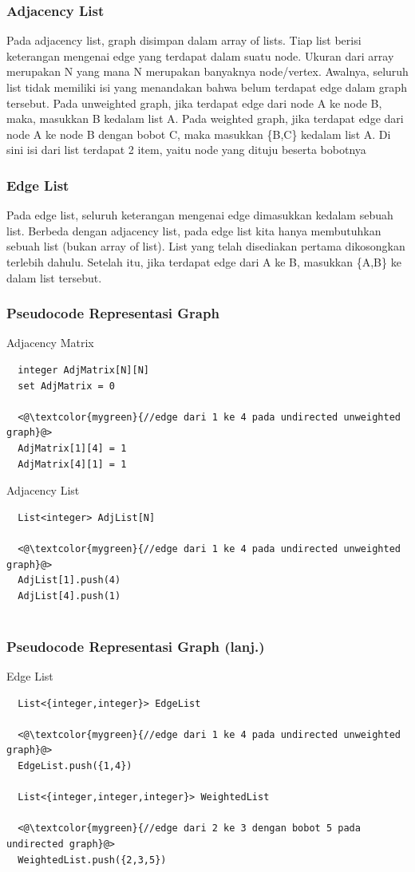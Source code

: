 \begin{frame}
\frametitle{Adjacency List}

Pada adjacency list, graph disimpan dalam array of lists. Tiap list berisi keterangan mengenai edge yang terdapat dalam suatu node. Ukuran dari array merupakan N yang mana N merupakan banyaknya node/vertex. \newline\newline
Awalnya, seluruh list tidak memiliki isi yang menandakan bahwa belum terdapat edge dalam graph tersebut. Pada unweighted graph, jika terdapat edge dari node A ke node B, maka, masukkan B kedalam list A. Pada weighted graph, jika terdapat edge dari node A ke node B dengan bobot C, maka masukkan \{B,C\} kedalam list A. Di sini isi dari list terdapat 2 item, yaitu node yang dituju beserta bobotnya
\end{frame}

\begin{frame}
\frametitle{Edge List}

Pada edge list, seluruh keterangan mengenai edge dimasukkan kedalam sebuah list. Berbeda dengan adjacency list, pada edge list kita hanya membutuhkan sebuah list (bukan array of list).
\newline\newline
List yang telah disediakan pertama dikosongkan terlebih dahulu. Setelah itu, jika terdapat edge dari A ke B, masukkan \{A,B\} ke dalam list tersebut. 

\end{frame}


\begin{frame}[fragile]
\frametitle{Pseudocode Representasi Graph}

Adjacency Matrix
\begin{lstlisting}
  integer AdjMatrix[N][N]
  set AdjMatrix = 0
  
  <@\textcolor{mygreen}{//edge dari 1 ke 4 pada undirected unweighted graph}@>
  AdjMatrix[1][4] = 1
  AdjMatrix[4][1] = 1
\end{lstlisting}
Adjacency List
\begin{lstlisting}
  List<integer> AdjList[N]
  
  <@\textcolor{mygreen}{//edge dari 1 ke 4 pada undirected unweighted graph}@>
  AdjList[1].push(4)
  AdjList[4].push(1)
  
\end{lstlisting}
\end{frame}

\begin{frame}[fragile]
\frametitle{Pseudocode Representasi Graph (lanj.)}

Edge List
\begin{lstlisting}
  List<{integer,integer}> EdgeList
  
  <@\textcolor{mygreen}{//edge dari 1 ke 4 pada undirected unweighted graph}@>
  EdgeList.push({1,4})
  
  List<{integer,integer,integer}> WeightedList
  
  <@\textcolor{mygreen}{//edge dari 2 ke 3 dengan bobot 5 pada undirected graph}@>
  WeightedList.push({2,3,5})
\end{lstlisting}
\end{frame}

